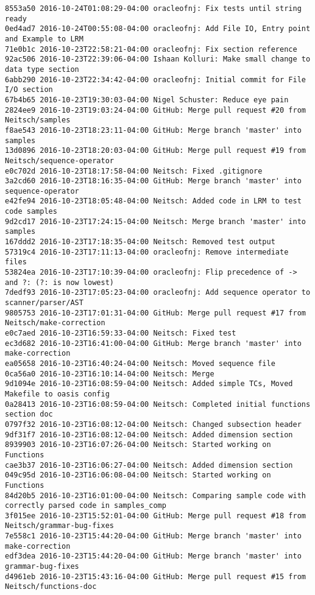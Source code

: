 \begin{lstlisting}
8553a50 2016-10-24T01:08:29-04:00 oracleofnj: Fix tests until string ready
0ed4ad7 2016-10-24T00:55:08-04:00 oracleofnj: Add File IO, Entry point and Example to LRM
71e0b1c 2016-10-23T22:58:21-04:00 oracleofnj: Fix section reference
92ac506 2016-10-23T22:39:06-04:00 Ishaan Kolluri: Make small change to data type section
6abb290 2016-10-23T22:34:42-04:00 oracleofnj: Initial commit for File I/O section
67b4b65 2016-10-23T19:30:03-04:00 Nigel Schuster: Reduce eye pain
2824ee9 2016-10-23T19:03:24-04:00 GitHub: Merge pull request #20 from Neitsch/samples
f8ae543 2016-10-23T18:23:11-04:00 GitHub: Merge branch 'master' into samples
13d0896 2016-10-23T18:20:03-04:00 GitHub: Merge pull request #19 from Neitsch/sequence-operator
e0c702d 2016-10-23T18:17:58-04:00 Neitsch: Fixed .gitignore
3a2cd60 2016-10-23T18:16:35-04:00 GitHub: Merge branch 'master' into sequence-operator
e42fe94 2016-10-23T18:05:48-04:00 Neitsch: Added code in LRM to test code samples
9d2cd17 2016-10-23T17:24:15-04:00 Neitsch: Merge branch 'master' into samples
167ddd2 2016-10-23T17:18:35-04:00 Neitsch: Removed test output
57319c4 2016-10-23T17:11:13-04:00 oracleofnj: Remove intermediate files
53824ea 2016-10-23T17:10:39-04:00 oracleofnj: Flip precedence of -> and ?: (?: is now lowest)
7dedf93 2016-10-23T17:05:23-04:00 oracleofnj: Add sequence operator to scanner/parser/AST
9805753 2016-10-23T17:01:31-04:00 GitHub: Merge pull request #17 from Neitsch/make-correction
e0c7aed 2016-10-23T16:59:33-04:00 Neitsch: Fixed test
ec3d682 2016-10-23T16:41:00-04:00 GitHub: Merge branch 'master' into make-correction
ea05658 2016-10-23T16:40:24-04:00 Neitsch: Moved sequence file
0ca56a0 2016-10-23T16:10:14-04:00 Neitsch: Merge
9d1094e 2016-10-23T16:08:59-04:00 Neitsch: Added simple TCs, Moved Makefile to oasis config
0a28413 2016-10-23T16:08:59-04:00 Neitsch: Completed initial functions section doc
0797f32 2016-10-23T16:08:12-04:00 Neitsch: Changed subsection header
9df31f7 2016-10-23T16:08:12-04:00 Neitsch: Added dimension section
8939903 2016-10-23T16:07:26-04:00 Neitsch: Started working on Functions
cae3b37 2016-10-23T16:06:27-04:00 Neitsch: Added dimension section
049c95d 2016-10-23T16:06:08-04:00 Neitsch: Started working on Functions
84d20b5 2016-10-23T16:01:00-04:00 Neitsch: Comparing sample code with correctly parsed code in samples_comp
3f015ee 2016-10-23T15:52:01-04:00 GitHub: Merge pull request #18 from Neitsch/grammar-bug-fixes
7e558c1 2016-10-23T15:44:20-04:00 GitHub: Merge branch 'master' into make-correction
edf3dea 2016-10-23T15:44:20-04:00 GitHub: Merge branch 'master' into grammar-bug-fixes
d4961eb 2016-10-23T15:43:16-04:00 GitHub: Merge pull request #15 from Neitsch/functions-doc

\end{lstlisting}
